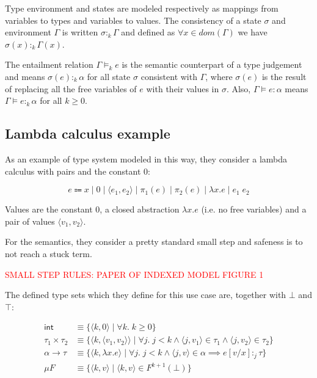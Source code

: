 \documentclass{article}
\begin{document}
Type environment and states are modeled respectively as mappings 
from variables to types and variables to values. The consistency 
of a state $\sigma$ and environment $\Gamma$ is written 
$\sigma :_k \Gamma$ and defined as $\forall x \in dom(\Gamma)$
we have $\sigma(x) :_k \Gamma(x)$.

The entailment relation $\Gamma \models_k e$ is the semantic 
counterpart of a type judgement and means 
$\sigma(e):_k \alpha$ for all state $\sigma$ consistent with 
$\Gamma$, where $\sigma(e)$ is the result of replacing all the 
free variables of $e$ with their values in $\sigma$. Also, 
$\Gamma \models e : \alpha$ means 
$\Gamma \models e :_k \alpha$ for all $k \geq 0$.

\subsection*{Lambda calculus example}

As an example of type system modeled in this way, they consider 
a lambda calculus with pairs and the constant $0$:

$$
  e \Coloneqq x 
      \;|\; 0 
      \;|\; \langle e_1, e_2 \rangle 
      \;|\; \pi_1(e) 
      \;|\; \pi_2(e)
      \;|\; \lambda x. e 
      \;|\; e_1\;e_2
$$

Values are the constant $0$, a closed abstraction 
$\lambda x.e$ (i.e. no free variables) and a pair of values 
$\langle v_1, v_2 \rangle$.

For the semantics, they consider a pretty standard small step and 
safeness is to not reach a stuck term.

\textcolor{red}{
  SMALL STEP RULES: PAPER OF INDEXED MODEL FIGURE 1
}

The defined type sets which they define for this use case are,
together with $\bot$ and $\top$:

\begin{align*}
  \mathsf{int} &\equiv \{ \langle k, 0 \rangle \;|\; 
    \forall k.\;k \geq 0 \} \\
  \tau_1 \times \tau_2 &\equiv 
    \{ \langle k, \langle v_1, v_2 \rangle \rangle \;|\; 
          \forall j.\;j < k \land
          \langle j, v_1\rangle \in \tau_1  \land 
          \langle j, v_2 \rangle \in \tau_2
    \} \\
  \alpha \rightarrow \tau &\equiv 
    \{ \langle k, \lambda x. e \rangle \;|\; 
        \forall j.\;j < k \land
        \langle j, v \rangle \in \alpha \implies
          e[v/x] :_j \tau
    \} \\ 
  \mu F &\equiv 
    \{ \langle k, v \rangle \;|\; \langle k, v \rangle \in 
      F^{k + 1}(\bot)
    \}
\end{align*}
\end{document}
